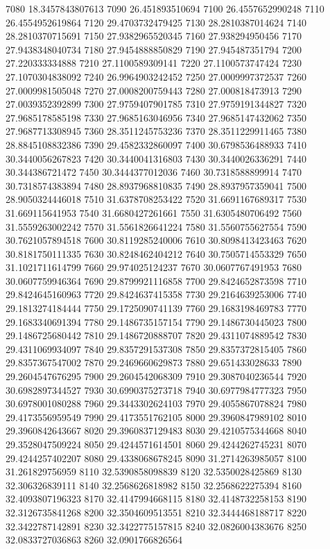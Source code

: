 {7080 18.3457843807613
7090 26.451893510694
7100 26.4557652990248
7110 26.4554952619864
7120 29.4703732479425
7130 28.2810387014624
7140 28.2810370715691
7150 27.9382965520345
7160 27.938294950456
7170 27.9438348040734
7180 27.9454888850829
7190 27.945487351794
7200 27.220333334888
7210 27.1100589309141
7220 27.1100573747424
7230 27.1070304838092
7240 26.9964903242452
7250 27.0009997372537
7260 27.0009981505048
7270 27.0008200759443
7280 27.000818473913
7290 27.0039352392899
7300 27.9759407901785
7310 27.9759191344827
7320 27.9685178585198
7330 27.9685163046956
7340 27.9685147432062
7350 27.9687713308945
7360 28.3511245753236
7370 28.3511229911465
7380 28.8845108832386
7390 29.4582332860097
7400 30.6798536488933
7410 30.3440056267823
7420 30.3440041316803
7430 30.3440026336291
7440 30.344386721472
7450 30.3444377012036
7460 30.7318588899914
7470 30.7318574383894
7480 28.8937968810835
7490 28.8937957359041
7500 28.9050324446018
7510 31.6378708253422
7520 31.6691167689317
7530 31.669115641953
7540 31.6680427261661
7550 31.6305480706492
7560 31.5559263002242
7570 31.5561826641224
7580 31.5560755627554
7590 30.7621057894518
7600 30.8119285240006
7610 30.8098413423463
7620 30.8181750111335
7630 30.8248462404212
7640 30.7505714553329
7650 31.1021711614799
7660 29.974025124237
7670 30.0607767491953
7680 30.0607759946364
7690 29.8799921116858
7700 29.8424652873598
7710 29.8424645160963
7720 29.8424637415358
7730 29.2164639253006
7740 29.1813274184444
7750 29.1725090741139
7760 29.1683198469783
7770 29.1683340691394
7780 29.1486735157154
7790 29.1486730445023
7800 29.1486725680442
7810 29.1486720888707
7820 29.4311074889542
7830 29.4311069934097
7840 29.8357291537308
7850 29.8357372815405
7860 29.8357367547002
7870 29.2469660629873
7880 29.651433028633
7890 29.2604547676295
7900 29.2604542068309
7910 29.3087040236544
7920 30.6982897344527
7930 30.6990375273718
7940 30.6977984777323
7950 30.6978001080288
7960 29.3443302624103
7970 29.4055867078824
7980 29.4173556959549
7990 29.4173551762105
8000 29.3960847989102
8010 29.3960842643667
8020 29.3960837129483
8030 29.4210575344668
8040 29.3528047509224
8050 29.4244571614501
8060 29.4244262745231
8070 29.4244257402207
8080 29.4338068678245
8090 31.2714263985057
8100 31.261829756959
8110 32.5390858098839
8120 32.5350028425869
8130 32.306326839111
8140 32.2568626818982
8150 32.2568622275394
8160 32.4093807196323
8170 32.4147994668115
8180 32.4148732258153
8190 32.3126735841268
8200 32.3504609513551
8210 32.3444468188717
8220 32.3422787142891
8230 32.3422775157815
8240 32.0826004383676
8250 32.0833727036863
8260 32.0901766826564
}
